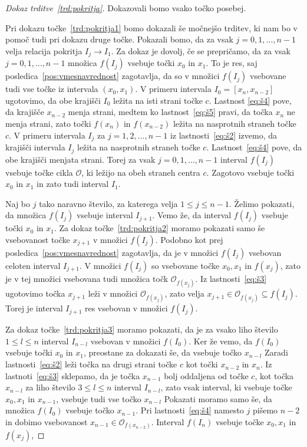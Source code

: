 \documentclass[mat2]{fmfdelo}
\begin{document}
\begin{proof}[Dokaz trditve~\ref{trd:pokritja}]
Dokazovali bomo vsako točko posebej. 

Pri dokazu točke~\ref{trd:pokritja1} bomo dokazali še močnejšo trditev, ki nam bo v pomoč tudi pri dokazu druge točke. Pokazali bomo, da za vsak $j = 0, 1, \dots, n-1$ velja relacija pokritja $I_j \to I_1$.  Za dokaz je dovolj, če se prepričamo, da za vsak $j=0, 1, \dots, n-1$ množica $f(I_j)$ vsebuje točki $x_0$ in $x_1$. To je res, saj posledica~\ref{pos:vmesnavrednost} zagotavlja, da so v množici $f(I_j)$ vsebovane tudi vse točke iz intervala $(x_0, x_1)$. V primeru intervala $I_0 = [x_n, x_{n-2}]$ ugotovimo, da obe krajišči $I_0$ ležita na isti strani točke $c$. Lastnost \ref{eq:š4} pove, da krajišče $x_{n-2}$ menja strani, medtem ko lastnost~\ref{eq:š5} pravi, da točka $x_n$ ne menja strani, zato točki $f(x_n)$ in $f(x_{n-2})$ ležita na nasprotnih straneh točke $c$. V primeru intervala $I_j$ za $j = 1, 2, \dots, n-1$ iz lastnosti~\ref{eq:š2} izvemo, da krajišči intervala $I_j$ ležita na nasprotnih straneh točke $c$. Lastnost~\ref{eq:š4} pove, da obe krajišči menjata strani. Torej za vsak $j=0, 1, \dots, n-1$ interval $f(I_j)$ vsebuje točke cikla $\mathcal{O}$, ki ležijo na obeh straneh centra $c$. Zagotovo vsebuje točki $x_0$ in $x_1$ in zato tudi interval $I_1$.

Naj bo $j$ tako naravno število, za katerega velja $1 \leq j \leq n-1$. Želimo pokazati, da množica $f(I_j)$ vsebuje interval $I_{j+1}$. Vemo že, da interval $f(I_j)$ vsebuje točki $x_0$ in $x_1$. Za dokaz točke~\ref{trd:pokritja2} moramo pokazati samo še vsebovanost točke $x_{j+1}$ v množici $f(I_j)$. Podobno kot prej posledica~\ref{pos:vmesnavrednost} zagotavlja, da je v množici $f(I_j)$ vsebovan celoten interval $I_{j+1}$. V množici $f(I_j)$ so vsebovane točke $x_0, x_1$ in $f(x_j)$, zato je v tej množici vsebovana tudi množica točk $\mathcal{O}_{f(x_j)}$. Iz lastnosti~\ref{eq:š3} ugotovimo točka $x_{j+1}$ leži v množici $\mathcal{O}_{f(x_j)}$, zato velja $x_{j+1} \in \mathcal{O}_{f(x_j)} \subseteq f(I_j)$. Torej je interval $I_{j+1}$ res vsebovan v množici $f(I_j)$.

Za dokaz točke~\ref{trd:pokritja3} moramo pokazati, da je za vsako liho število $1 \leq l \leq n$ interval $I_{n-l}$ vsebovan v množici $f(I_0)$.  
Ker že vemo, da $f(I_0)$ vsebuje točki $x_0$ in $x_1$, preostane za dokazati še, da vsebuje točko $x_{n-l}$ Zaradi lastnosti~\ref{eq:š2} leži točka na drugi strani točke $c$ kot točki $x_{n-2}$ in $x_n$. Iz lastnoti~\ref{eq:š3} sklepamo, da je točka $x_{n-1}$ bolj oddaljena od točke $c$, kot točka $x_{n-l}$ za liho število $3 \leq l \leq n$ interval $I_{n-l}$, zato vsak interval, ki vsebuje točke $x_0, x_1$ in $x_{n-1}$, vsebuje tudi vse točko $x_{n-l}$ Pokazati moramo samo še, da množica $f(I_0)$ vsebuje točko $x_{n-1}$. Pri lastnosti~\ref{eq:š4} namesto $j$ pišemo $n-2$ in dobimo vsebovanost $x_{n-1} \in \mathcal{O}_{f(x_{n-2})}$. Interval $f(I_n)$ vsebuje točke $x_0, x_1$ in $f(x_j)$, 
\end{proof}
\end{document}
